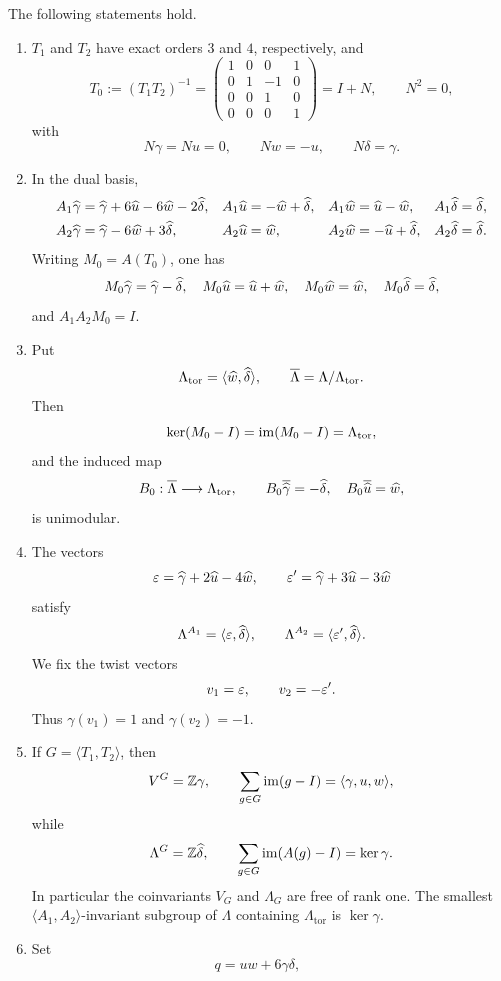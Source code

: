 \begin{proposition}\label{prop:linear-algebra}
The following statements hold.
\begin{enumerate}[label=\textup{(\roman*)}]
\item $T_1$ and $T_2$ have exact orders $3$ and $4$, respectively, and
\[
T_0:=(T_1T_2)^{-1}
 =\begin{pmatrix}
1&0&0&1\\
0&1&-1&0\\
0&0&1&0\\
0&0&0&1
\end{pmatrix}=I+N,
\qquad N^2=0,
\]
with
\[
N\gamma=Nu=0,\qquad Nw=-u,\qquad N\delta=\gamma.
\]
\item In the dual basis,
\[
\begin{aligned}
A_1\widehat\gamma&=\widehat\gamma+6\widehat u-6\widehat w-2\widehat\delta,
&A_1\widehat u&=-\widehat w+\widehat\delta,
&A_1\widehat w&=\widehat u-\widehat w,
&A_1\widehat\delta&=\widehat\delta,\\
A_2\widehat\gamma&=\widehat\gamma-6\widehat w+3\widehat\delta,
&A_2\widehat u&=\widehat w,
&A_2\widehat w&=-\widehat u+\widehat\delta,
&A_2\widehat\delta&=\widehat\delta.
\end{aligned}
\]
Writing $M_0=A(T_0)$, one has
\[
M_0\widehat\gamma=\widehat\gamma-\widehat\delta,
\quad M_0\widehat u=\widehat u+\widehat w,
\quad M_0\widehat w=\widehat w,
\quad M_0\widehat\delta=\widehat\delta,
\]
and $A_1A_2M_0=I$.
\item Put
\[
 \Lambda_{\mathrm{tor}}=\langle\widehat w,\widehat\delta\rangle,
 \qquad \overline\Lambda=\Lambda/\Lambda_{\mathrm{tor}}.
\]
Then
\[
\ker(M_0-I)=\operatorname{im}(M_0-I)=\Lambda_{\mathrm{tor}},
\]
and the induced map
\[
 B_0:\overline\Lambda\longrightarrow\Lambda_{\mathrm{tor}},
 \qquad B_0\overline{\widehat\gamma}=-\widehat\delta,
 \quad B_0\overline{\widehat u}=\widehat w,
\]
is unimodular.
\item The vectors
\[
 \varepsilon=\widehat\gamma+2\widehat u-4\widehat w,
 \qquad
 \varepsilon'=\widehat\gamma+3\widehat u-3\widehat w
\]
satisfy
\[
 \Lambda^{A_1}=\langle\varepsilon,\widehat\delta\rangle,
 \qquad
 \Lambda^{A_2}=\langle\varepsilon',\widehat\delta\rangle.
\]
We fix the twist vectors
\[
 v_1=\varepsilon,
 \qquad v_2=-\varepsilon'.
\]
Thus $\gamma(v_1)=1$ and $\gamma(v_2)=-1$.
\item If $G=\langle T_1,T_2\rangle$, then
\[
 V^G=\mathbb Z\gamma,
 \qquad
 \sum_{g\in G}\operatorname{im}(g-I)=\langle\gamma,u,w\rangle,
\]
while
\[
 \Lambda^G=\mathbb Z\widehat\delta,
 \qquad
 \sum_{g\in G}\operatorname{im}(A(g)-I)=\ker\gamma.
\]
In particular the coinvariants $V_G$ and $\Lambda_G$ are free of rank one.
The smallest $\langle A_1,A_2\rangle$-invariant subgroup of $\Lambda$
containing $\Lambda_{\mathrm{tor}}$ is $\ker\gamma$.
\item Set
\[
 q=uw+6\gamma\delta,
 \qquad
\]
\end{enumerate}
\end{proposition}
